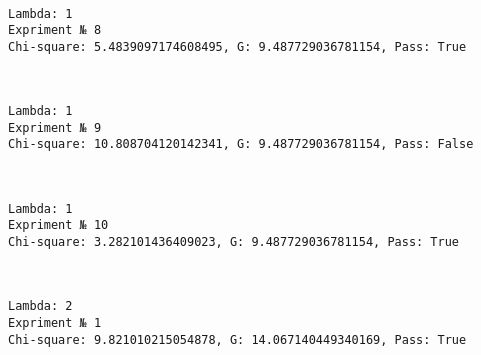\documentclass[11pt]{article}
\begin{document}
    \begin{center}
    \end{center}
    { \hspace*{\fill} \\}
    
    \begin{Verbatim}[commandchars=\\\{\}]
Lambda: 1
Expriment № 8
Chi-square: 5.4839097174608495, G: 9.487729036781154, Pass: True
    \end{Verbatim}

    \begin{center}
    \end{center}
    { \hspace*{\fill} \\}
    
    \begin{Verbatim}[commandchars=\\\{\}]
Lambda: 1
Expriment № 9
Chi-square: 10.808704120142341, G: 9.487729036781154, Pass: False
    \end{Verbatim}

    \begin{center}
    \end{center}
    { \hspace*{\fill} \\}
    
    \begin{Verbatim}[commandchars=\\\{\}]
Lambda: 1
Expriment № 10
Chi-square: 3.282101436409023, G: 9.487729036781154, Pass: True
    \end{Verbatim}

    \begin{center}
    \end{center}
    { \hspace*{\fill} \\}
    
    \begin{Verbatim}[commandchars=\\\{\}]
Lambda: 2
Expriment № 1
Chi-square: 9.821010215054878, G: 14.067140449340169, Pass: True
    \end{Verbatim}
\end{document}
